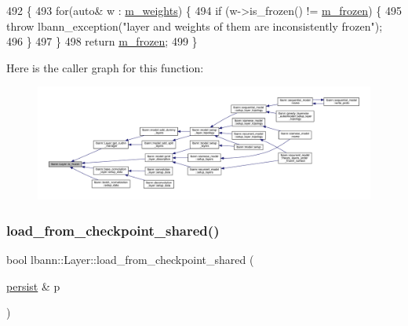 \begin{DoxyCode}
492                             \{
493   \textcolor{keywordflow}{for}(\textcolor{keyword}{auto}& w : \hyperlink{classlbann_1_1Layer_a7954e30fbf9100a6ba4b56d02767a469}{m\_weights}) \{
494     \textcolor{keywordflow}{if} (w->is\_frozen() != \hyperlink{classlbann_1_1Layer_afdc60df9731a3ecdeeeb8175fa483676}{m\_frozen}) \{
495       \textcolor{keywordflow}{throw} lbann\_exception(\textcolor{stringliteral}{"layer and weights of them are inconsistently frozen"});
496     \}
497   \}
498   \textcolor{keywordflow}{return} \hyperlink{classlbann_1_1Layer_afdc60df9731a3ecdeeeb8175fa483676}{m\_frozen};
499 \}
\end{DoxyCode}
Here is the caller graph for this function\+:\nopagebreak
\begin{figure}[H]
\begin{center}
\leavevmode
\includegraphics[width=350pt]{classlbann_1_1Layer_af3c0f9f32eb631f4fdf34ad040ef8637_icgraph}
\end{center}
\end{figure}
\mbox{\label{classlbann_1_1Layer_a9e262970ecc64166e8b6610e2502ad30}} 
\subsubsection{\texorpdfstring{load\+\_\+from\+\_\+checkpoint\+\_\+shared()}{load\_from\_checkpoint\_shared()}}
{\footnotesize\ttfamily bool lbann\+::\+Layer\+::load\+\_\+from\+\_\+checkpoint\+\_\+shared (\begin{DoxyParamCaption}\item[{\hyperlink{classlbann_1_1persist}{persist} \&}]{p }\end{DoxyParamCaption})\hspace{0.3cm}{\ttfamily [virtual]}}



